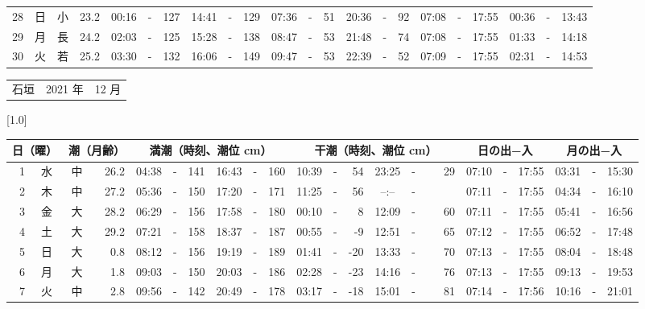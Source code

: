 \documentclass[12pt,a4j]{jsarticle}
\begin{document}
\begin{table}[htbp]
\begin{center}
{\begin{tabular}{|rc|cr|ccrccr|ccrccr|ccc|ccc|}
28 & 日 & 小 & 23.2 &  00:16 &-& 127 &  14:41 &-& 129 &  07:36 &-&  51 &  20:36 &-&  92 & 07:08 & -& 17:55 & 00:36 & -& 13:43 \\
29 & 月 & 長 & 24.2 &  02:03 &-& 125 &  15:28 &-& 138 &  08:47 &-&  53 &  21:48 &-&  74 & 07:08 & -& 17:55 & 01:33 & -& 14:18 \\
30 & 火 & 若 & 25.2 &  03:30 &-& 132 &  16:06 &-& 149 &  09:47 &-&  53 &  22:39 &-&  52 & 07:09 & -& 17:55 & 02:31 & -& 14:53 \\
   \hline
   \end{tabular}}
   \end{center}
\end{table}
\newpage
 \begin{table}[htbp]
 \begin{center}
 \begin{tabular}{lcc}
 \LARGE{石垣}  & \large{2021 年} & \large{12 月} \\
 \end{tabular}
 \end{center}
 \begin{center}
    \scalebox{0.7}[1.0]{
    \begin{tabular}{|rc|cr|ccrccr|ccrccr|ccc|ccc|}
    \hline
    \multicolumn{2}{|c|}{日（曜）} & \multicolumn{2}{c|}{潮（月齢）} & \multicolumn{6}{c|}{満潮（時刻、潮位 cm）} & \multicolumn{6}{c|}{干潮（時刻、潮位 cm）} & \multicolumn{3}{c|}{日の出−入} &  \multicolumn{3}{c|}{月の出−入}\\
 \hline
 1 & 水 & 中 & 26.2 &  04:38 &-& 141 &  16:43 &-& 160 &  10:39 &-&  54 &  23:25 &-&  29 & 07:10 & -& 17:55 & 03:31 & -& 15:30 \\
 2 & 木 & 中 & 27.2 &  05:36 &-& 150 &  17:20 &-& 171 &  11:25 &-&  56 &  --:-- &-&~~~~~ & 07:11 & -& 17:55 & 04:34 & -& 16:10 \\
 3 & 金 & 大 & 28.2 &  06:29 &-& 156 &  17:58 &-& 180 &  00:10 &-&   8 &  12:09 &-&  60 & 07:11 & -& 17:55 & 05:41 & -& 16:56 \\
 4 & 土 & 大 & 29.2 &  07:21 &-& 158 &  18:37 &-& 187 &  00:55 &-&  -9 &  12:51 &-&  65 & 07:12 & -& 17:55 & 06:52 & -& 17:48 \\
 5 & 日 & 大 &  0.8 &  08:12 &-& 156 &  19:19 &-& 189 &  01:41 &-& -20 &  13:33 &-&  70 & 07:13 & -& 17:55 & 08:04 & -& 18:48 \\
 6 & 月 & 大 &  1.8 &  09:03 &-& 150 &  20:03 &-& 186 &  02:28 &-& -23 &  14:16 &-&  76 & 07:13 & -& 17:55 & 09:13 & -& 19:53 \\
 7 & 火 & 中 &  2.8 &  09:56 &-& 142 &  20:49 &-& 178 &  03:17 &-& -18 &  15:01 &-&  81 & 07:14 & -& 17:56 & 10:16 & -& 21:01 \\

\end{tabular}}
\end{center}
\end{table}
\end{document}
